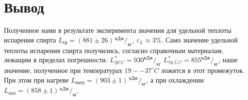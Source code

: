 \documentclass[a4paper,12pt]{article}
\begin{document}
\section{Вывод}
	Полученное нами в результате эксперимента значения для удельной теплоты испарения спирта $L_{ср} = (881 \pm 26)\, ^{кДж}/_{кг}$, $\varepsilon_{L} \approx 3\%$. Само значение удельной теплоты испарения спирта получились, согласно справочным материалам, лежащим в пределах погрешности. $L^{*}_{20^\circ C} = 930^{кДж}/_{кг}$ $L^{*}_{78.5^\circ C} = 855^{кДж}/_{кг}$, наше значение, полученное при температурах $19--37^\circ C$ ложится в этот промежуток.
	При этом при нагреве $L_{нагр} = (903 \pm 1)\, ^{кДж}/_{кг}$, а при охлаждении $L_{охл} = (858 \pm 1)\, ^{кДж}/_{кг}$.
\end{document}
